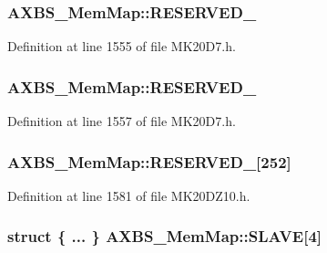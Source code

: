\subsubsection[{\texorpdfstring{R\+E\+S\+E\+R\+V\+E\+D\+\_\+2}{RESERVED_2}}]{ A\+X\+B\+S\+\_\+\+Mem\+Map\+::\+R\+E\+S\+E\+R\+V\+E\+D\+\_}\hypertarget{struct_a_x_b_s___mem_map_a45fb43654f72a76d11e4ac397aa31b48}{}\label{struct_a_x_b_s___mem_map_a45fb43654f72a76d11e4ac397aa31b48}


Definition at line 1555 of file M\+K20\+D7.\+h.

\subsubsection[{\texorpdfstring{R\+E\+S\+E\+R\+V\+E\+D\+\_\+3}{RESERVED_3}}]{ A\+X\+B\+S\+\_\+\+Mem\+Map\+::\+R\+E\+S\+E\+R\+V\+E\+D\+\_}\hypertarget{struct_a_x_b_s___mem_map_ab3b4a2a99ba4b5679f31057b4ae0e2d8}{}\label{struct_a_x_b_s___mem_map_ab3b4a2a99ba4b5679f31057b4ae0e2d8}


Definition at line 1557 of file M\+K20\+D7.\+h.

\subsubsection[{\texorpdfstring{R\+E\+S\+E\+R\+V\+E\+D\+\_\+4}{RESERVED_4}}]{ A\+X\+B\+S\+\_\+\+Mem\+Map\+::\+R\+E\+S\+E\+R\+V\+E\+D\+\_\mbox{[}252\mbox{]}}\hypertarget{struct_a_x_b_s___mem_map_aa163ab2918180ca89176ceb13b329716}{}\label{struct_a_x_b_s___mem_map_aa163ab2918180ca89176ceb13b329716}


Definition at line 1581 of file M\+K20\+D\+Z10.\+h.

\subsubsection[{\texorpdfstring{S\+L\+A\+VE}{SLAVE}}]{\setlength{\rightskip}{0pt plus 5cm}struct \{ ... \}   A\+X\+B\+S\+\_\+\+Mem\+Map\+::\+S\+L\+A\+VE\mbox{[}4\mbox{]}}\hypertarget{struct_a_x_b_s___mem_map_aa2954cfd83985c167495c18c91888dec}{}\label{struct_a_x_b_s___mem_map_aa2954cfd83985c167495c18c91888dec}

